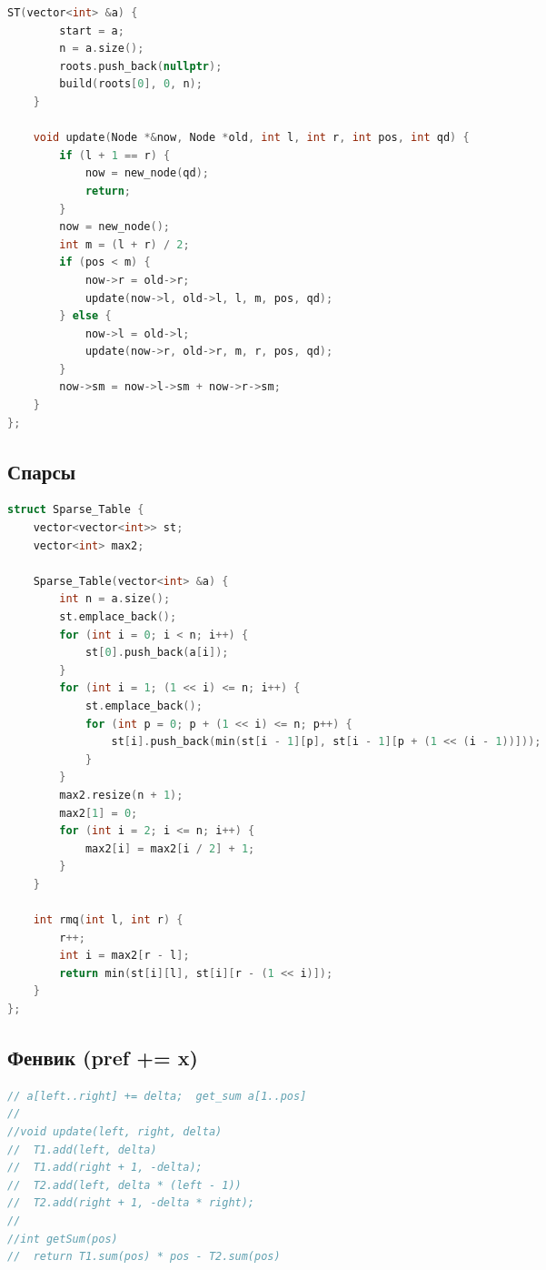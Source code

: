\documentclass[10pt,a4paper,landscape,twosided]{extarticle}
\begin{document}
\begin{multicols}{3}
\begin{lstlisting}[language=C++]
    ST(vector<int> &a) {
        start = a;
        n = a.size();
        roots.push_back(nullptr);
        build(roots[0], 0, n);
    }

    void update(Node *&now, Node *old, int l, int r, int pos, int qd) {
        if (l + 1 == r) {
            now = new_node(qd);
            return;
        }
        now = new_node();
        int m = (l + r) / 2;
        if (pos < m) {
            now->r = old->r;
            update(now->l, old->l, l, m, pos, qd);
        } else {
            now->l = old->l;
            update(now->r, old->r, m, r, pos, qd);
        }
        now->sm = now->l->sm + now->r->sm;
    }
};

\end{lstlisting}

\subsection{Спарсы}
\begin{lstlisting}[language=C++]
struct Sparse_Table {
    vector<vector<int>> st;
    vector<int> max2;

    Sparse_Table(vector<int> &a) {
        int n = a.size();
        st.emplace_back();
        for (int i = 0; i < n; i++) {
            st[0].push_back(a[i]);
        }
        for (int i = 1; (1 << i) <= n; i++) {
            st.emplace_back();
            for (int p = 0; p + (1 << i) <= n; p++) {
                st[i].push_back(min(st[i - 1][p], st[i - 1][p + (1 << (i - 1))]));
            }
        }
        max2.resize(n + 1);
        max2[1] = 0;
        for (int i = 2; i <= n; i++) {
            max2[i] = max2[i / 2] + 1;
        }
    }

    int rmq(int l, int r) {
        r++;
        int i = max2[r - l];
        return min(st[i][l], st[i][r - (1 << i)]);
    }
};

\end{lstlisting}

\subsection{Фенвик (pref += x)}
\begin{lstlisting}[language=C++]
// a[left..right] += delta;  get_sum a[1..pos]
//
//void update(left, right, delta)
//  T1.add(left, delta)
//  T1.add(right + 1, -delta);
//  T2.add(left, delta * (left - 1))
//  T2.add(right + 1, -delta * right);
//
//int getSum(pos)
//  return T1.sum(pos) * pos - T2.sum(pos)


\end{lstlisting}
\end{multicols}
\end{document}
